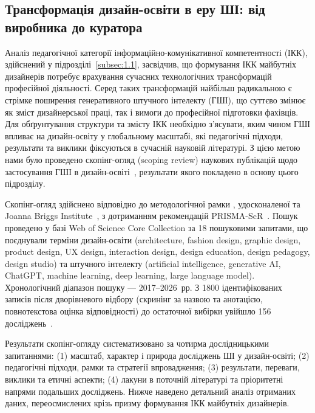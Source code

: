 \subsection{Трансформація дизайн-освіти в еру ШІ: від виробника до куратора}\label{subsec:1.2}

Аналіз педагогічної категорії інформаційно-комунікативної компетентності (ІКК), здійснений у підрозділі~\ref{subsec:1.1}, засвідчив, що формування ІКК майбутніх дизайнерів потребує врахування сучасних технологічних трансформацій професійної діяльності. Серед таких трансформацій найбільш радикальною є стрімке поширення генеративного штучного інтелекту (ГШІ), що суттєво змінює як зміст дизайнерської праці, так і вимоги до професійної підготовки фахівців. Для обґрунтування структури та змісту ІКК необхідно з'ясувати, яким чином ГШІ впливає на дизайн-освіту у глобальному масштабі, які педагогічні підходи, результати та виклики фіксуються в сучасній науковій літературі. З цією метою нами було проведено скопінг-огляд (scoping review) наукових публікацій щодо застосування ГШІ в дизайн-освіті~\cite{Musiienko2026ScopingReview}, результати якого покладено в основу цього підрозділу.

Скопінг-огляд здійснено відповідно до методологічної рамки \citet{Arksey2005}, удосконаленої \citet{Levac2010} та Joanna Briggs Institute~\cite{Peters2020}, з дотриманням рекомендацій PRISMA-ScR~\cite{Tricco2018}. Пошук проведено у базі Web of Science Core Collection за 18 пошуковими запитами, що поєднували терміни дизайн-освіти (architecture, fashion design, graphic design, product design, UX design, interaction design, design education, design pedagogy, design studio) та штучного інтелекту (artificial intelligence, generative AI, ChatGPT, machine learning, deep learning, large language model). Хронологічний діапазон пошуку --- 2017--2026~рр. З 1800 ідентифікованих записів після дворівневого відбору (скринінг за назвою та анотацією, повнотекстова оцінка відповідності) до остаточної вибірки увійшло 156 досліджень~\cite{Musiienko2026ScopingReview}.

Результати скопінг-огляду систематизовано за чотирма дослідницькими запитаннями: (1) масштаб, характер і природа досліджень ШІ у дизайн-освіті; (2) педагогічні підходи, рамки та стратегії впровадження; (3) результати, переваги, виклики та етичні аспекти; (4) лакуни в поточній літературі та пріоритетні напрями подальших досліджень. Нижче наведено детальний аналіз отриманих даних, переосмислених крізь призму формування ІКК майбутніх дизайнерів.

